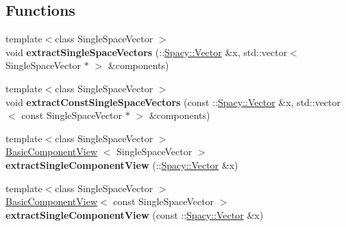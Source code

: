 \subsection*{\-Functions}
\begin{DoxyCompactItemize}
\item 
\hypertarget{namespaceSpacy_1_1ProductSpace_acbae440a7b0142c22b3abb4fceec6a3d}{{\footnotesize template$<$class Single\-Space\-Vector $>$ }\\void {\bfseries extract\-Single\-Space\-Vectors} (\-::\hyperlink{classSpacy_1_1Vector}{\-Spacy\-::\-Vector} \&x, std\-::vector$<$ \-Single\-Space\-Vector $\ast$ $>$ \&components)}\label{namespaceSpacy_1_1ProductSpace_acbae440a7b0142c22b3abb4fceec6a3d}

\item 
\hypertarget{namespaceSpacy_1_1ProductSpace_a21a0ee5576b97303796ff46d59b2e138}{{\footnotesize template$<$class Single\-Space\-Vector $>$ }\\void {\bfseries extract\-Const\-Single\-Space\-Vectors} (const \-::\hyperlink{classSpacy_1_1Vector}{\-Spacy\-::\-Vector} \&x, std\-::vector$<$ const \-Single\-Space\-Vector $\ast$ $>$ \&components)}\label{namespaceSpacy_1_1ProductSpace_a21a0ee5576b97303796ff46d59b2e138}

\item 
\hypertarget{namespaceSpacy_1_1ProductSpace_ad68c9cf83d263605393f28af63801f29}{{\footnotesize template$<$class Single\-Space\-Vector $>$ }\\\hyperlink{structSpacy_1_1ProductSpace_1_1BasicComponentView}{\-Basic\-Component\-View}\*
$<$ \-Single\-Space\-Vector $>$ {\bfseries extract\-Single\-Component\-View} (\-::\hyperlink{classSpacy_1_1Vector}{\-Spacy\-::\-Vector} \&x)}\label{namespaceSpacy_1_1ProductSpace_ad68c9cf83d263605393f28af63801f29}

\item 
\hypertarget{namespaceSpacy_1_1ProductSpace_af3dc843c29a545e7f7f4e45b5ae5b02b}{{\footnotesize template$<$class Single\-Space\-Vector $>$ }\\\hyperlink{structSpacy_1_1ProductSpace_1_1BasicComponentView}{\-Basic\-Component\-View}$<$ const \*
\-Single\-Space\-Vector $>$ {\bfseries extract\-Single\-Component\-View} (const \-::\hyperlink{classSpacy_1_1Vector}{\-Spacy\-::\-Vector} \&x)}\label{namespaceSpacy_1_1ProductSpace_af3dc843c29a545e7f7f4e45b5ae5b02b}


\end{DoxyCompactItemize}

